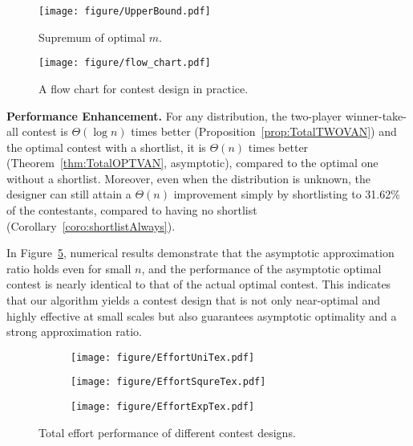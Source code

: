 \begin{figure}
    \centering
    \begin{minipage}{0.30\linewidth}
        \centering
        \texttt{[image: figure/UpperBound.pdf]}
        \caption{Supremum of optimal $m$.}
        \label{fig:universal1}
    \end{minipage}
    \begin{minipage}{0.55\linewidth}
        \centering
        \texttt{[image: figure/flow\_chart.pdf]}
        \caption{A flow chart for contest design in practice.}
        \label{fig:flowchart}
    \end{minipage}
\end{figure}



\noindent \textbf{Performance Enhancement.} For any distribution, the two-player winner-take-all contest is $\Theta(\log n)$ times better (Proposition~\ref{prop:TotalTWOVAN}) and the optimal contest with a shortlist, it is $\Theta(n)$ times better (Theorem~\ref{thm:TotalOPTVAN}, asymptotic), compared to the optimal one without a shortlist. Moreover, even when the distribution is unknown, the designer can still attain a $\Theta(n)$ improvement simply by shortlisting to 31.62\% of the contestants, compared to having no shortlist (Corollary~\ref{coro:shortlistAlways}).

In Figure~\ref{fig:DistributionOpt1}, numerical results demonstrate that the asymptotic approximation ratio holds even for small $n$, and the performance of the asymptotic optimal contest is nearly identical to that of the actual optimal contest. This indicates that our algorithm yields a contest design that is not only near-optimal and highly effective at small scales but also guarantees asymptotic optimality and a strong approximation ratio. 

\begin{figure}[h]
\begin{subfigure}[ht]{0.30\textwidth}
    \centering
    \texttt{[image: figure/EffortUniTex.pdf]}
    \label{fig:disopt-a1}
    \end{subfigure}
\begin{subfigure}[ht]{0.30\textwidth}
    \centering
    \texttt{[image: figure/EffortSqureTex.pdf]}
    \label{fig:disopt-b1}
    \end{subfigure}
\begin{subfigure}[ht]{0.30\textwidth}
    \centering
    \texttt{[image: figure/EffortExpTex.pdf]}
    \label{fig:disopt-c1}
    \end{subfigure}
    
\caption{Total effort performance of different contest designs.}
\label{fig:DistributionOpt1}
\end{figure}

